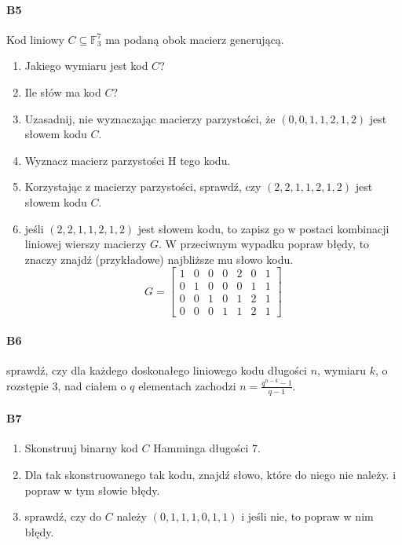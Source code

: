 \documentclass[a4paper,12pt]{article}
\theoremstyle{definition}%
\theoremstyle{definition}
\theoremstyle{problem}
\begin{document}
\paragraph{B5} Kod liniowy $C\subseteq \mathbb{F}_3^7$ ma podaną obok macierz generującą.
\begin{enumerate}[label=\alph*)]
\item Jakiego wymiaru jest kod $C$?
\item Ile słów ma kod $C$?
\item Uzasadnij, nie wyznaczając macierzy parzystości, że $(0,0,1,1,2,1,2)$ jest słowem kodu $C$.
\item Wyznacz macierz parzystości H tego kodu.
\item Korzystając z macierzy parzystości, sprawdź, czy $(2,2,1,1,2,1,2)$ jest słowem kodu $C$.
\item jeśli $(2, 2, 1, 1, 2, 1, 2)$ jest słowem kodu, to zapisz go w postaci kombinacji liniowej wierszy macierzy $G$. W przeciwnym wypadku popraw błędy, to znaczy znajdź (przykładowe) najbliższe mu słowo kodu.
$$G =\begin{bmatrix}
1& 0 &0 &0 &2& 0& 1\\
0& 1& 0& 0& 0& 1& 1\\
0& 0 &1 &0 &1 &2 &1\\
0& 0 &0& 1& 1& 2& 1
\end{bmatrix}$$
\end{enumerate}

\paragraph{B6} sprawdź, czy dla każdego doskonałego liniowego kodu długości $n$, wymiaru $k$, o rozstępie 3, nad ciałem o $q$ elementach zachodzi $n =\frac{q^{n-k}-1}{q-1}$.

\paragraph{B7}
\begin{enumerate}[label=\alph*)]
\item Skonstruuj binarny kod $C$ Hamminga długości $7$.
\item Dla tak skonstruowanego tak kodu, znajdź słowo, które do niego nie należy. i popraw w tym słowie błędy.
\item sprawdź, czy do $C$ należy $(0, 1, 1, 1, 0, 1, 1)$ i jeśli nie, to popraw w nim błędy.
\end{enumerate}
\end{document}
